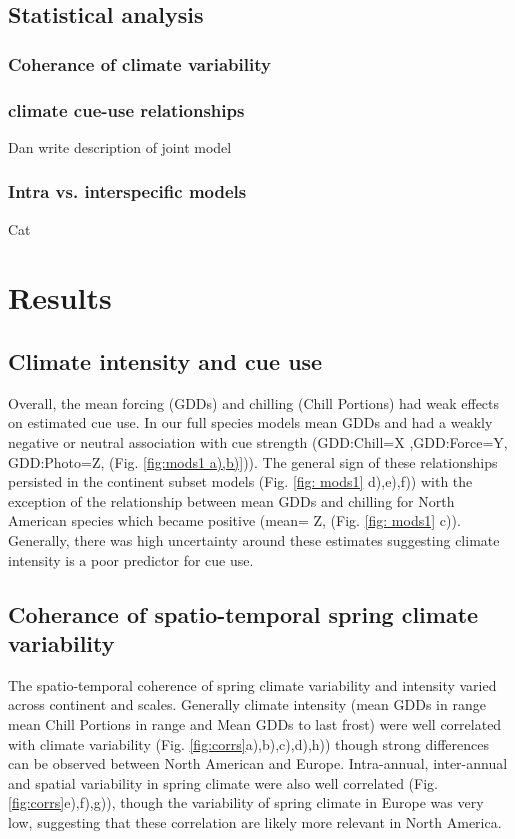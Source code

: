 \documentclass[12pt]{article}\usepackage[]{graphicx}\usepackage[]{color}
\begin{document}
\subsection*{Statistical analysis}
\subsubsection*{Coherance of climate variability}
\subsubsection*{climate cue-use relationships}
Dan write description of joint model

\subsubsection*{Intra vs. interspecific models}
Cat 






\section*{Results}
\subsection*{Climate intensity and cue use}
Overall, the mean forcing (GDDs) and chilling (Chill Portions) had weak effects on estimated cue use. 
In our full species models mean GDDs and had a weakly negative or neutral association with cue strength (GDD:Chill=X ,GDD:Force=Y, GDD:Photo=Z, (Fig. \ref{fig:mods1 a),b)})). The general sign of these relationships persisted in the continent subset models (Fig. \ref{fig: mods1} d),e),f)) with the exception of the relationship between mean GDDs and chilling for North American species which became positive (mean= Z, (Fig. \ref{fig: mods1} c)). Generally, there was high uncertainty around these estimates suggesting climate intensity is a poor predictor for cue use. 

\subsection*{Coherance of spatio-temporal spring climate variability}
The spatio-temporal coherence of spring climate variability and intensity varied across continent and scales. Generally climate intensity (mean GDDs in range mean Chill Portions in range and Mean GDDs to last frost) were well correlated with climate variability (Fig. \ref{fig:corrs}a),b),c),d),h)) though strong differences can be observed between North American and Europe.  Intra-annual, inter-annual and spatial variability in spring climate were also well correlated  (Fig. \ref{fig:corrs}e),f),g)), though the variability of spring climate in Europe was very low, suggesting that these correlation are likely more relevant in North America.
\end{document}
